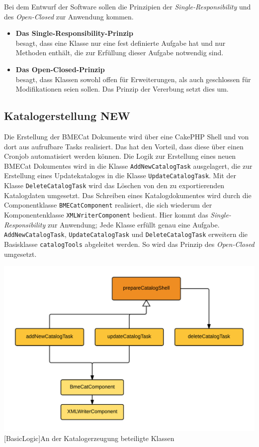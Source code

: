 	Bei dem Entwurf der Software sollen die Prinzipien der \textit{Single-Responsibility} und des \textit{Open-Closed} zur Anwendung kommen.
	
	\begin{itemize}
	\item \textbf{Das Single-Responsibility-Prinzip}\\besagt, dass eine Klasse nur eine fest definierte Aufgabe hat und nur Methoden enthält, die zur Erfüllung dieser Aufgabe notwendig sind.
	\item \textbf{Das Open-Closed-Prinzip}\\ besagt, dass Klassen sowohl offen für Erweiterungen, als auch geschlossen für Modifikationen seien sollen. Das Prinzip der Vererbung setzt dies um.
	\end{itemize}
	
	\subsection{Katalogerstellung NEW}
	
	Die Erstellung der BMECat Dokumente wird über eine CakePHP Shell und von dort aus aufrufbare Tasks realisiert. Das hat den Vorteil, dass diese über einen Cronjob automatisiert werden können.
	Die Logik zur Erstellung eines neuen BMECat Dokumentes wird in die Klasse \texttt{AddNewCatalogTask} ausgelagert, die zur Erstellung eines Updatekataloges in die Klasse 
	\texttt{UpdateCatalogTask}. Mit der Klasse \texttt{DeleteCatalogTask} wird das Löschen von den zu exportierenden Katalogdaten umgesetzt. Das Schreiben eines Katalogdokumentes wird durch die Componentklasse \texttt{BMECatComponent} realisiert, die sich wiederum der Komponentenklasse \texttt{XMLWriterComponent} bedient. Hier kommt das \textit{Single-Responsibility} zur Anwendung; Jede Klasse erfüllt genau eine Aufgabe. \texttt{AddNewCatalogTask}, \texttt{UpdateCatalogTask} und \texttt{DeleteCatalogTask} erweitern die Basisklasse \texttt{catalogTools} abgeleitet werden. So wird das Prinzip des \textit{Open-Closed} umgesetzt.

	\begin{minipage}{\linewidth}
		\vspace{1em}
		\centering
		\includegraphics[width=0.7 \linewidth]{img/VererbungShellSimple}
		[BasicLogic]{An der Katalogerzeugung beteiligte Klassen}
		\vspace{1em}
	\end{minipage}	
	
